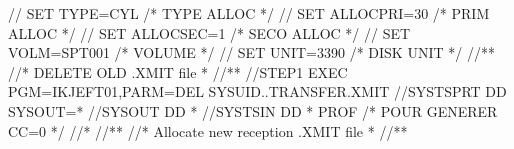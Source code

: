 \documentclass[letterpaper,10pt,english]{sphinxmanual}
\begin{document}
\begin{sphinxVerbatim}[commandchars=\\\{\}]
// SET TYPE=CYL                                        /* TYPE ALLOC */
// SET ALLOCPRI=30                                     /* PRIM ALLOC */
// SET ALLOCSEC=1                                      /* SECO ALLOC */
// SET VOLM=SPT001                                         /* VOLUME */
// SET UNIT=3390                                        /* DISK UNIT */
//*\PYGZhy{}\PYGZhy{}\PYGZhy{}\PYGZhy{}\PYGZhy{}\PYGZhy{}\PYGZhy{}\PYGZhy{}\PYGZhy{}\PYGZhy{}\PYGZhy{}\PYGZhy{}\PYGZhy{}\PYGZhy{}\PYGZhy{}\PYGZhy{}\PYGZhy{}\PYGZhy{}\PYGZhy{}\PYGZhy{}\PYGZhy{}\PYGZhy{}\PYGZhy{}\PYGZhy{}\PYGZhy{}\PYGZhy{}\PYGZhy{}\PYGZhy{}\PYGZhy{}\PYGZhy{}\PYGZhy{}\PYGZhy{}\PYGZhy{}\PYGZhy{}\PYGZhy{}\PYGZhy{}\PYGZhy{}\PYGZhy{}\PYGZhy{}\PYGZhy{}\PYGZhy{}\PYGZhy{}\PYGZhy{}\PYGZhy{}\PYGZhy{}\PYGZhy{}\PYGZhy{}\PYGZhy{}\PYGZhy{}\PYGZhy{}\PYGZhy{}\PYGZhy{}\PYGZhy{}\PYGZhy{}\PYGZhy{}\PYGZhy{}\PYGZhy{}\PYGZhy{}\PYGZhy{}\PYGZhy{}\PYGZhy{}\PYGZhy{}\PYGZhy{}\PYGZhy{}\PYGZhy{}\PYGZhy{}\PYGZhy{}*
//* DELETE OLD .XMIT file                                             *
//*\PYGZhy{}\PYGZhy{}\PYGZhy{}\PYGZhy{}\PYGZhy{}\PYGZhy{}\PYGZhy{}\PYGZhy{}\PYGZhy{}\PYGZhy{}\PYGZhy{}\PYGZhy{}\PYGZhy{}\PYGZhy{}\PYGZhy{}\PYGZhy{}\PYGZhy{}\PYGZhy{}\PYGZhy{}\PYGZhy{}\PYGZhy{}\PYGZhy{}\PYGZhy{}\PYGZhy{}\PYGZhy{}\PYGZhy{}\PYGZhy{}\PYGZhy{}\PYGZhy{}\PYGZhy{}\PYGZhy{}\PYGZhy{}\PYGZhy{}\PYGZhy{}\PYGZhy{}\PYGZhy{}\PYGZhy{}\PYGZhy{}\PYGZhy{}\PYGZhy{}\PYGZhy{}\PYGZhy{}\PYGZhy{}\PYGZhy{}\PYGZhy{}\PYGZhy{}\PYGZhy{}\PYGZhy{}\PYGZhy{}\PYGZhy{}\PYGZhy{}\PYGZhy{}\PYGZhy{}\PYGZhy{}\PYGZhy{}\PYGZhy{}\PYGZhy{}\PYGZhy{}\PYGZhy{}\PYGZhy{}\PYGZhy{}\PYGZhy{}\PYGZhy{}\PYGZhy{}\PYGZhy{}\PYGZhy{}\PYGZhy{}*
//STEP1 EXEC PGM=IKJEFT01,PARM=\PYGZsq{}DEL \PYGZsq{}\PYGZsq{}\PYGZam{}SYSUID..TRANSFER.XMIT\PYGZsq{}\PYGZsq{}\PYGZsq{}
//SYSTSPRT DD SYSOUT=*
//SYSOUT DD *
//SYSTSIN DD *
PROF                                            /* POUR GENERER CC=0 */
//*
//*\PYGZhy{}\PYGZhy{}\PYGZhy{}\PYGZhy{}\PYGZhy{}\PYGZhy{}\PYGZhy{}\PYGZhy{}\PYGZhy{}\PYGZhy{}\PYGZhy{}\PYGZhy{}\PYGZhy{}\PYGZhy{}\PYGZhy{}\PYGZhy{}\PYGZhy{}\PYGZhy{}\PYGZhy{}\PYGZhy{}\PYGZhy{}\PYGZhy{}\PYGZhy{}\PYGZhy{}\PYGZhy{}\PYGZhy{}\PYGZhy{}\PYGZhy{}\PYGZhy{}\PYGZhy{}\PYGZhy{}\PYGZhy{}\PYGZhy{}\PYGZhy{}\PYGZhy{}\PYGZhy{}\PYGZhy{}\PYGZhy{}\PYGZhy{}\PYGZhy{}\PYGZhy{}\PYGZhy{}\PYGZhy{}\PYGZhy{}\PYGZhy{}\PYGZhy{}\PYGZhy{}\PYGZhy{}\PYGZhy{}\PYGZhy{}\PYGZhy{}\PYGZhy{}\PYGZhy{}\PYGZhy{}\PYGZhy{}\PYGZhy{}\PYGZhy{}\PYGZhy{}\PYGZhy{}\PYGZhy{}\PYGZhy{}\PYGZhy{}\PYGZhy{}\PYGZhy{}\PYGZhy{}\PYGZhy{}\PYGZhy{}*
//* Allocate new reception .XMIT file                                 *
//*\PYGZhy{}\PYGZhy{}\PYGZhy{}\PYGZhy{}\PYGZhy{}\PYGZhy{}\PYGZhy{}\PYGZhy{}\PYGZhy{}\PYGZhy{}\PYGZhy{}\PYGZhy{}\PYGZhy{}\PYGZhy{}\PYGZhy{}\PYGZhy{}\PYGZhy{}\PYGZhy{}\PYGZhy{}\PYGZhy{}\PYGZhy{}\PYGZhy{}\PYGZhy{}\PYGZhy{}\PYGZhy{}\PYGZhy{}\PYGZhy{}\PYGZhy{}\PYGZhy{}\PYGZhy{}\PYGZhy{}\PYGZhy{}\PYGZhy{}\PYGZhy{}\PYGZhy{}\PYGZhy{}\PYGZhy{}\PYGZhy{}\PYGZhy{}\PYGZhy{}\PYGZhy{}\PYGZhy{}\PYGZhy{}\PYGZhy{}\PYGZhy{}\PYGZhy{}\PYGZhy{}\PYGZhy{}\PYGZhy{}\PYGZhy{}\PYGZhy{}\PYGZhy{}\PYGZhy{}\PYGZhy{}\PYGZhy{}\PYGZhy{}\PYGZhy{}\PYGZhy{}\PYGZhy{}\PYGZhy{}\PYGZhy{}\PYGZhy{}\PYGZhy{}\PYGZhy{}\PYGZhy{}\PYGZhy{}\PYGZhy{}*

\end{sphinxVerbatim}
\end{document}
